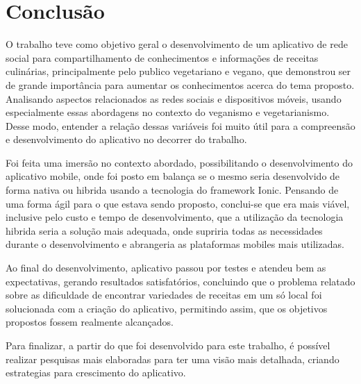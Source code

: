 
\chapter{Conclusão}




O trabalho teve como objetivo geral o desenvolvimento de um aplicativo de rede social para compartilhamento de conhecimentos e informações de receitas culinárias, principalmente pelo publico vegetariano e vegano, que demonstrou ser de grande importância para aumentar os conhecimentos acerca do tema proposto. Analisando aspectos relacionados as redes sociais e dispositivos móveis, usando especialmente essas abordagens no contexto do veganismo e vegetarianismo. Desse modo, entender a relação dessas variáveis foi muito útil para a compreensão e desenvolvimento do aplicativo no decorrer do trabalho.

Foi feita uma imersão no contexto abordado, possibilitando o desenvolvimento do aplicativo mobile, onde foi posto em balança se o mesmo seria desenvolvido de forma nativa ou hibrida usando a tecnologia do framework Ionic. Pensando de uma forma ágil para o que estava sendo proposto, conclui-se que era mais viável, inclusive pelo custo e tempo de desenvolvimento, que a utilização da tecnologia hibrida seria a solução mais adequada, onde supriria todas as necessidades durante o desenvolvimento e abrangeria as plataformas mobiles mais utilizadas.

Ao final do desenvolvimento, aplicativo passou por testes e atendeu bem as expectativas, gerando resultados satisfatórios, concluindo que o problema relatado sobre as dificuldade de encontrar variedades de receitas em um só local foi solucionada com a criação do aplicativo, permitindo assim, que os objetivos propostos fossem realmente alcançados.

Para finalizar, a partir do que foi desenvolvido para este trabalho,  é possível realizar pesquisas mais elaboradas para ter uma visão mais detalhada, criando estrategias para crescimento do aplicativo. 

